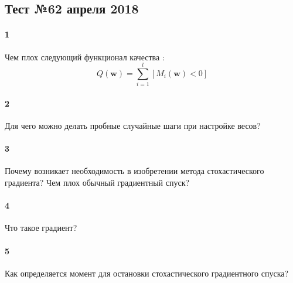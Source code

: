\documentclass[a4paper,12pt]{article}
\begin{document}
  \subsection*{Тест №6\hfill{2 апреля 2018}}

  \paragraph{1} Чем плох следующий функционал качества :
  $$Q(\mathbf{w}) = \sum\limits_{i=1}^l \left[ M_i(\mathbf{w}) < 0 \right] $$
  
  \makebox[\linewidth]{\hrulefill}
  \makebox[\linewidth]{\hrulefill}
  
  \paragraph{2} Для чего можно делать пробные случайные шаги при настройке весов?
  
  \makebox[\linewidth]{\hrulefill}
  \makebox[\linewidth]{\hrulefill}

  \paragraph{3} Почему возникает необходимость в изобретении метода стохастического градиента? Чем плох обычный градиентный спуск?

  \makebox[\linewidth]{\hrulefill}
  \makebox[\linewidth]{\hrulefill}
  \makebox[\linewidth]{\hrulefill}

  \paragraph{4} Что такое градиент?
    
  \makebox[\linewidth]{\hrulefill}
  \makebox[\linewidth]{\hrulefill}
  \makebox[\linewidth]{\hrulefill}
  
  \paragraph{5} Как определяется момент для остановки стохастического градиентного спуска?

  \makebox[\linewidth]{\hrulefill}
  \makebox[\linewidth]{\hrulefill}
  \makebox[\linewidth]{\hrulefill}
  \makebox[\linewidth]{\hrulefill}
  
\end{document}
